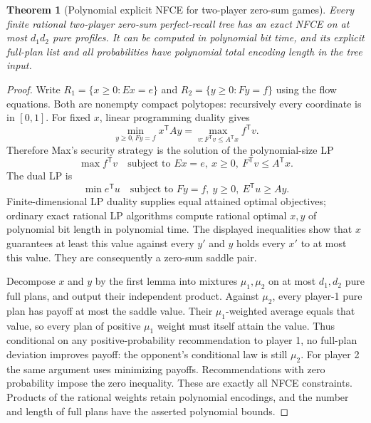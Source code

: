 \documentclass[11pt]{article}
\newtheorem{theorem}{Theorem}
\theoremstyle{definition}
\begin{document}
\begin{theorem}[Polynomial explicit NFCE for two-player zero-sum games]
Every finite rational two-player zero-sum perfect-recall tree has an exact
NFCE on at most $d_1d_2$ pure profiles. It can be computed in polynomial bit
time, and its explicit full-plan list and all probabilities have polynomial
total encoding length in the tree input.
\end{theorem}
\begin{proof}
Write $R_1=\{x\geq0:Ex=e\}$ and $R_2=\{y\geq0:Fy=f\}$ using the flow
equations. Both are nonempty compact polytopes: recursively every coordinate
is in $[0,1]$. For fixed $x$, linear programming duality gives
\[
 \min_{y\geq0,Fy=f}x^{\mathsf T}Ay
 =\max_{v:F^{\mathsf T}v\leq A^{\mathsf T}x}f^{\mathsf T}v.
\]
Therefore Max's security strategy is the solution of the polynomial-size LP
\[
 \max f^{\mathsf T}v\quad\text{subject to }Ex=e,\ x\geq0,
 \ F^{\mathsf T}v\leq A^{\mathsf T}x.
\]
The dual LP is
\[
 \min e^{\mathsf T}u\quad\text{subject to }Fy=f,\ y\geq0,
 \ E^{\mathsf T}u\geq Ay.
\]
Finite-dimensional LP duality supplies equal attained optimal objectives;
ordinary exact rational LP algorithms compute rational optimal $x,y$ of
polynomial bit length in polynomial time. The displayed inequalities show
that $x$ guarantees at least this value against every $y'$ and $y$ holds every
$x'$ to at most this value. They are consequently a zero-sum saddle pair.

Decompose $x$ and $y$ by the first lemma into mixtures $\mu_1,\mu_2$ on at
most $d_1,d_2$ pure full plans, and output their independent product. Against
$\mu_2$, every player-1 pure plan has payoff at most the saddle value. Their
$\mu_1$-weighted average equals that value, so every plan of positive $\mu_1$
weight must itself attain the value. Thus conditional on any positive-probability
recommendation to player 1, no full-plan deviation improves payoff: the
opponent's conditional law is still $\mu_2$. For player 2 the same argument
uses minimizing payoffs. Recommendations with zero probability impose the
zero inequality. These are exactly all NFCE constraints. Products of the
rational weights retain polynomial encodings, and the number and length of
full plans have the asserted polynomial bounds.
\end{proof}
\end{document}
